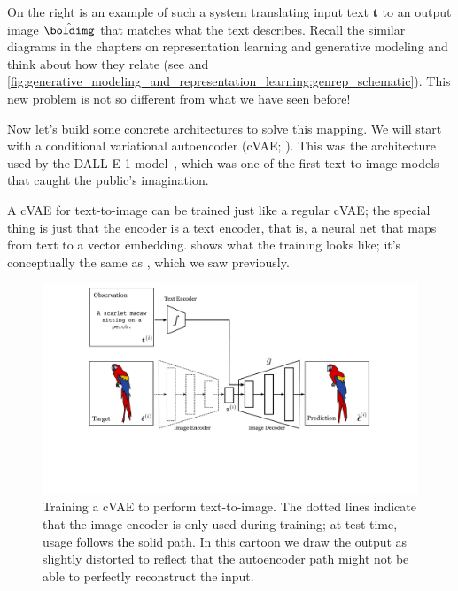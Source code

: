 On the right is an example of such a system translating input text $\mathbf{t}$ to an output image $\hat{\boldimg}$ that matches what the text describes. Recall the similar diagrams in the chapters on representation learning and generative modeling and think about how they relate (see \figs{\ref{fig:representation_learning:autoencoder_diagram}} and \ref{fig:generative_modeling_and_representation_learning:genrep_schematic}). This new problem is not so different from what we have seen before!

Now let's build some concrete architectures to solve this mapping. We will start with a conditional variational autoencoder (cVAE; \sect{\ref{sec:conditional_generative_models:cVAE}}). This was the architecture used by the DALL-E 1 model~\cite{dalle1}, which was one of the first text-to-image models that caught the public's imagination.

A cVAE for text-to-image can be trained just like a regular cVAE; the special thing is just that the encoder is a text encoder, that is, a neural net that maps from text to a vector embedding. \Fig{\ref{fig:vision_and_language:text2im_VAE_training}} shows what the training looks like; it's conceptually the same as \fig{\ref{fig:conditional_generative_models:cVAE_ball_bouncing_example_nets}}, which we saw previously.
\begin{figure}[h!]
    \centerline{
    \includegraphics[width=1.0\linewidth]{./figures/vision_and_language/text2im_VAE_training.pdf}
    }
    \caption{Training a cVAE to perform text-to-image. The dotted lines indicate that the image encoder is only used during training; at test time, usage follows the solid path. In this cartoon we draw the output as slightly distorted to reflect that the autoencoder path might not be able to perfectly reconstruct the input.}
    \label{fig:vision_and_language:text2im_VAE_training}
\end{figure}


